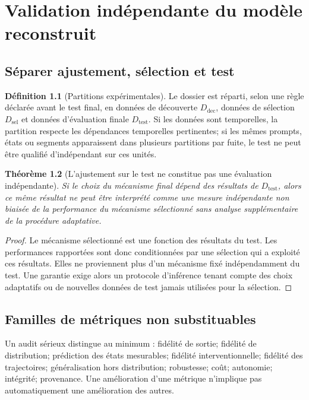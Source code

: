 \documentclass[11pt,oneside]{book}
\newtheorem{theoreme}{Théorème}[chapter]
\theoremstyle{definition}
\newtheorem{definition}[theoreme]{Définition}
\theoremstyle{remark}
\newcommand{\1}{\mathbf 1}
\begin{document}
\chapter{Validation indépendante du modèle reconstruit}
\section{Séparer ajustement, sélection et test}
\begin{definition}[Partitions expérimentales]
Le dossier est réparti, selon une règle déclarée avant le test final, en données de découverte $D_{\mathrm{dec}}$, données de sélection $D_{\mathrm{sel}}$ et données d'évaluation finale $D_{\mathrm{test}}$. Si les données sont temporelles, la partition respecte les dépendances temporelles pertinentes; si les mêmes prompts, états ou segments apparaissent dans plusieurs partitions par fuite, le test ne peut être qualifié d'indépendant sur ces unités.
\end{definition}

\begin{theoreme}[L'ajustement sur le test ne constitue pas une évaluation indépendante]
Si le choix du mécanisme final dépend des résultats de $D_{\mathrm{test}}$, alors ce même résultat ne peut être interprété comme une mesure indépendante non biaisée de la performance du mécanisme sélectionné sans analyse supplémentaire de la procédure adaptative.
\end{theoreme}
\begin{proof}
Le mécanisme sélectionné est une fonction des résultats du test. Les performances rapportées sont donc conditionnées par une sélection qui a exploité ces résultats. Elles ne proviennent plus d'un mécanisme fixé indépendamment du test. Une garantie exige alors un protocole d'inférence tenant compte des choix adaptatifs ou de nouvelles données de test jamais utilisées pour la sélection.\end{proof}

\section{Familles de métriques non substituables}
Un audit sérieux distingue au minimum : fidélité de sortie; fidélité de distribution; prédiction des états mesurables; fidélité interventionnelle; fidélité des trajectoires; généralisation hors distribution; robustesse; coût; autonomie; intégrité; provenance. Une amélioration d'une métrique n'implique pas automatiquement une amélioration des autres.
\end{document}
